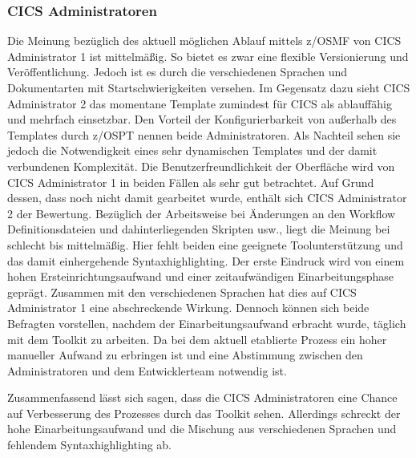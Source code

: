 \subsubsection{CICS Administratoren}
Die Meinung bezüglich des aktuell möglichen Ablauf mittels z/OSMF von CICS Administrator 1 ist mittelmäßig.
So bietet es zwar eine flexible Versionierung und Veröffentlichung.
Jedoch ist es durch die verschiedenen Sprachen und Dokumentarten mit Startschwierigkeiten versehen.
Im Gegensatz dazu sieht CICS Administrator 2 das momentane Template zumindest für CICS als ablauffähig und mehrfach einsetzbar.
Den Vorteil der Konfigurierbarkeit von außerhalb des Templates durch z/OSPT nennen beide Administratoren.
Als Nachteil sehen sie jedoch die Notwendigkeit eines sehr dynamischen Templates und der damit verbundenen Komplexität.
Die Benutzerfreundlichkeit der Oberfläche wird von CICS Administrator 1 in beiden Fällen als sehr gut betrachtet.
Auf Grund dessen, dass noch nicht damit gearbeitet wurde, enthält sich CICS Administrator 2 der Bewertung.
Bezüglich der Arbeitsweise bei Änderungen an den Workflow Definitionsdateien und dahinterliegenden Skripten usw., liegt die Meinung bei schlecht bis mittelmäßig.
Hier fehlt beiden eine geeignete Toolunterstützung und das damit einhergehende Syntaxhighlighting.
Der erste Eindruck wird von einem hohen Ersteinrichtungsaufwand und einer zeitaufwändigen Einarbeitungsphase geprägt.
Zusammen mit den verschiedenen Sprachen hat dies auf CICS Administrator 1 eine abschreckende Wirkung.
Dennoch können sich beide Befragten vorstellen, nachdem der Einarbeitungsaufwand erbracht wurde, täglich mit dem Toolkit zu arbeiten.
Da bei dem aktuell etablierte Prozess ein hoher manueller Aufwand zu erbringen ist und eine Abstimmung zwischen den Administratoren und dem Entwicklerteam notwendig ist.

Zusammenfassend lässt sich sagen, dass die CICS Administratoren eine Chance auf Verbesserung des Prozesses durch das Toolkit sehen.
Allerdings schreckt der hohe Einarbeitungsaufwand und die Mischung aus verschiedenen Sprachen und fehlendem Syntaxhighlighting ab.

